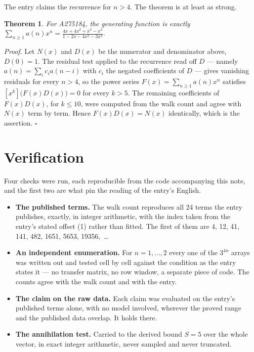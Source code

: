 \documentclass[11pt]{article}
\newtheorem{theorem}{Theorem}
\theoremstyle{definition}
\begin{document}
The entry claims the recurrence for $n > 4$. The theorem is at least as strong.

\begin{theorem} For A275184, the generating function is exactly $\sum_{n\ge 1} a(n)x^n = \frac{4x + 4x^{2} + x^{3} - x^{4}}{1 - 2x - 4x^{2} - 3x^{3}}$.\end{theorem}

{\itshape Proof.} Let $N(x)$ and $D(x)$ be the numerator and denominator above, $D(0)=1$. The residual test applied to the recurrence read off $D$ --- namely $a(n) = \sum_i c_i a(n-i)$ with $c_i$ the negated coefficients of $D$ --- gives vanishing residuals for every $n > 4$, so the power series $F(x)=\sum_{n\ge 1}a(n)x^n$ satisfies $[x^k]\bigl(F(x)D(x)\bigr) = 0$ for every $k > 5$. The remaining coefficients of $F(x)D(x)$, for $k \le 10$, were computed from the walk count and agree with $N(x)$ term by term. Hence $F(x)D(x) = N(x)$ identically, which is the assertion. $\square$

\section{Verification}

Four checks were run, each reproducible from the code accompanying this note, and the first two are what pin the reading of the entry's English.

\begin{itemize}

\item {\bfseries The published terms.} The walk count reproduces all 24 terms the entry publishes, exactly, in integer arithmetic, with the index taken from the entry's stated offset (1) rather than fitted. The first of them are 4, 12, 41, 141, 482, 1651, 5653, 19356,~\dots

\item {\bfseries An independent enumeration.} For $n = 1,\dots,2$ every one of the $3^{4n}$ arrays was written out and tested cell by cell against the condition as the entry states it --- no transfer matrix, no row window, a separate piece of code. The counts agree with the walk count and with the entry.

\item {\bfseries The claim on the raw data.} Each claim was evaluated on the entry's published terms alone, with no model involved, wherever the proved range and the published data overlap. It holds there.

\item {\bfseries The annihilation test.} Carried to the derived bound $S = 5$ over the whole vector, in exact integer arithmetic, never sampled and never truncated.

\end{itemize}
\end{document}
